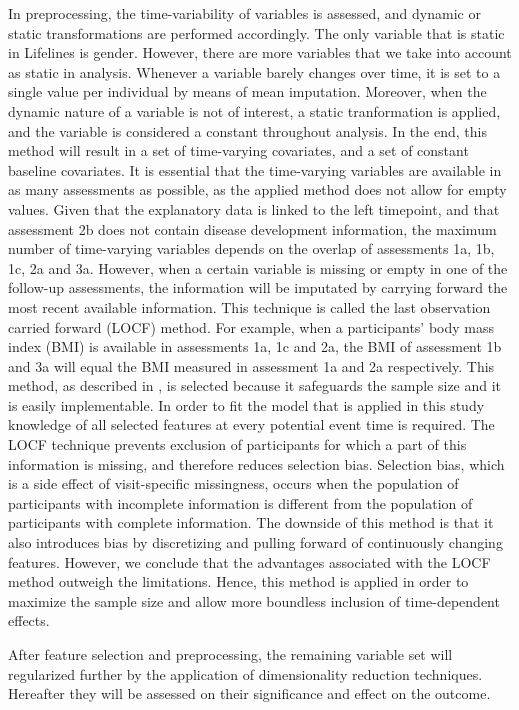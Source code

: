 In preprocessing, the time-variability of variables is assessed, and dynamic or static transformations are performed accordingly. The only variable that is static in Lifelines is gender. However, there are more variables that we take into account as static in analysis. Whenever a variable barely changes over time, it is set to a single value per individual by means of mean imputation. Moreover, when the dynamic nature of a variable is not of interest, a static tranformation is applied, and the variable is considered a constant throughout analysis. In the end, this method will result in a set of time-varying covariates, and a set of constant baseline covariates. It is essential that the time-varying variables are available in as many assessments as possible, as the applied method does not allow for empty values. Given that the explanatory data is linked to the left timepoint, and that assessment 2b does not contain disease development information, the maximum number of time-varying variables depends on the overlap of assessments 1a, 1b, 1c, 2a and 3a. However, when a certain variable is missing or empty in one of the follow-up assessments, the information will be imputated by carrying forward the most recent available information. This technique is called the last observation carried forward (LOCF) method. For example, when a participants' body mass index (BMI) is available in assessments 1a, 1c and 2a, the BMI of assessment 1b and 3a will equal the BMI measured in assessment 1a and 2a respectively. This method, as described in \cite{liu2006incorporating}, is selected because it safeguards the sample size and it is easily implementable. In order to fit the model that is applied in this study knowledge of all selected features at every potential event time is required. The LOCF technique prevents exclusion of participants for which a part of this information is missing, and therefore reduces selection bias. Selection bias, which is a side effect of visit-specific missingness, occurs when the population of participants with incomplete information is different from the population of participants with complete information. The downside of this method is that it also introduces bias by discretizing and pulling forward of continuously changing features. However, we conclude that the advantages associated with the LOCF method outweigh the limitations. Hence, this method is applied in order to maximize the sample size and allow more boundless inclusion of time-dependent effects.  

After feature selection and preprocessing, the remaining variable set will regularized further by the application of dimensionality reduction techniques. Hereafter they will be assessed on their significance and effect on the outcome. 

